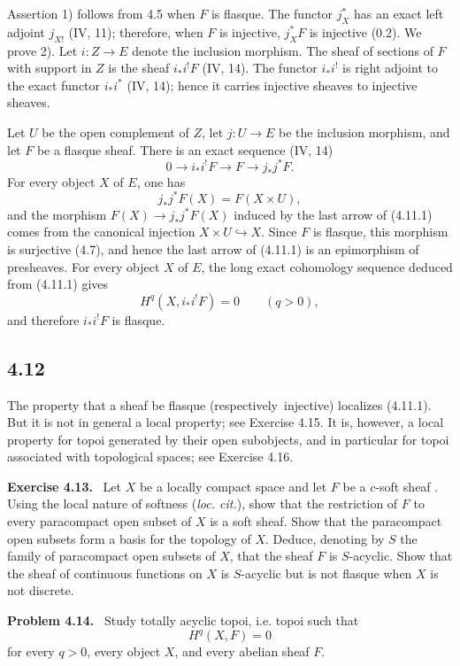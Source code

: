 \documentclass[11pt]{article}
\newcommand{\resp}{respectively}
\newenvironment{remarktext}[1]{\par\medskip\noindent\textbf{#1.}\ }{\par\medskip}
\begin{document}
Assertion 1) follows from 4.5 when $F$ is flasque. The functor $j_X^*$ has an exact left adjoint $j_{X!}$ (IV, 11); therefore, when $F$ is injective, $j_X^*F$ is injective (0.2). We prove 2). Let $i:Z\to E$ denote the inclusion morphism. The sheaf of sections of $F$ with support in $Z$ is the sheaf $i_*i^!F$ (IV, 14). The functor $i_*i^!$ is right adjoint to the exact functor $i_*i^*$ (IV, 14); hence it carries injective sheaves to injective sheaves.

Let $U$ be the open complement of $Z$, let $j:U\to E$ be the inclusion morphism, and let $F$ be a flasque sheaf. There is an exact sequence (IV, 14)
\[
0\longrightarrow i_*i^!F\longrightarrow F\longrightarrow j_*j^*F.
\tag{4.11.1}
\]
For every object $X$ of $E$, one has
\[
j_*j^*F(X)=F(X\times U),
\]
and the morphism $F(X)\to j_*j^*F(X)$ induced by the last arrow of (4.11.1) comes from the canonical injection $X\times U\hookrightarrow X$. Since $F$ is flasque, this morphism is surjective (4.7), and hence the last arrow of (4.11.1) is an epimorphism of presheaves. For every object $X$ of $E$, the long exact cohomology sequence deduced from (4.11.1) gives
\[
H^q(X,i_*i^!F)=0\qquad(q>0),
\]
and therefore $i_*i^!F$ is flasque.

\subsection*{4.12}
The property that a sheaf be flasque (\resp\ injective) localizes (4.11.1). But it is not in general a local property; see Exercise 4.15. It is, however, a local property for topoi generated by their open subobjects, and in particular for topoi associated with topological spaces; see Exercise 4.16.

\begin{remarktext}{Exercise 4.13}
Let $X$ be a locally compact space and let $F$ be a $c$-soft sheaf \cite{7}. Using the local nature of softness (\emph{loc. cit.}), show that the restriction of $F$ to every paracompact open subset of $X$ is a soft sheaf. Show that the paracompact open subsets form a basis for the topology of $X$. Deduce, denoting by $S$ the family of paracompact open subsets of $X$, that the sheaf $F$ is $S$-acyclic. Show that the sheaf of continuous functions on $X$ is $S$-acyclic but is not flasque when $X$ is not discrete.
\end{remarktext}

\begin{remarktext}{Problem 4.14}
Study totally acyclic topoi, i.e. topoi such that
\[
H^q(X,F)=0
\]
for every $q>0$, every object $X$, and every abelian sheaf $F$.
\end{remarktext}
\end{document}
